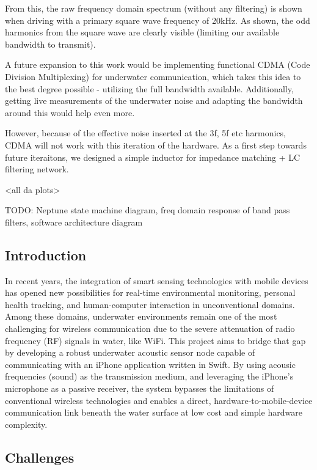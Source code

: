 From this, the raw frequency domain spectrum (without any filtering) is shown when driving with a primary square wave frequency of 20kHz. As shown, the odd harmonics from the square wave are clearly visible (limiting our available bandwidth to transmit).

A future expansion to this work would be implementing functional CDMA (Code Division Multiplexing) for underwater communication, which takes this idea to the best degree possible - utilizing the full bandwidth available. Additionally, getting live measurements of the underwater noise and adapting the bandwidth around this would help even more.

However, because of the effective noise inserted at the 3f, 5f etc harmonics, CDMA will not work with this iteration of the hardware. As a first step towards future iteraitons, we designed a simple inductor for impedance matching + LC filtering network.

<all da plots>

TODO: Neptune state machine diagram, freq domain response of band pass filters, software architecture diagram




\subsection{Introduction}

In recent years, the integration of smart sensing technologies with mobile devices has opened new possibilities for real-time environmental monitoring, personal health tracking, and human-computer interaction in unconventional domains. Among these domains, underwater environments remain one of the most challenging for wireless communication due to the severe attenuation of radio frequency (RF) signals in water, like WiFi. This project aims to bridge that gap by developing a robust underwater acoustic sensor node capable of communicating with an iPhone application written in Swift. By using acousic frequencies (sound) as the transmission medium, and leveraging the iPhone's microphone as a passive receiver, the system bypasses the limitations of conventional wireless technologies and enables a direct, hardware-to-mobile-device communication link beneath the water surface at low cost and simple hardware complexity.

\subsection{Challenges}

